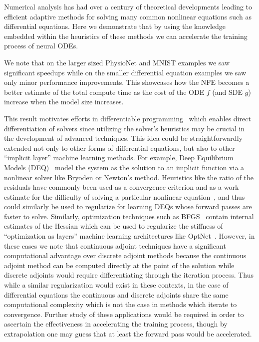 Numerical analysis has had over a century of theoretical developments leading to efficient adaptive methods for solving many common nonlinear equations such as differential equations. Here we demonstrate that by using the knowledge embedded within the heuristics of these methods we can accelerate the training process of neural ODEs.

We note that on the larger sized PhysioNet and MNIST examples we saw significant speedups while on the smaller differential equation examples we saw only minor performance improvements. This showcases how the NFE becomes a better estimate of the total compute time as the cost of the ODE $f$ (and SDE $g$) increase when the model size increases.

This result motivates efforts in differentiable programming~\cite{wang2018backpropagation, abadi2019simple, rackauckas2020generalized} which enables direct differentiation of solvers since utilizing the solver's heuristics may be crucial in the development of advanced techniques. This idea could be straightforwardly extended not only to other forms of differential equations, but also to other ``implicit layer'' machine learning methods. For example, Deep Equilibrium Models (DEQ)~\cite{bai_deep_2019} model the system as the solution to an implicit function via a nonlinear solver like Bryoden or Newton's method. Heuristics like the ratio of the residuals have commonly been used as a convergence criterion and as a work estimate for the difficulty of solving a particular nonlinear equation~\cite{wanner1996solving}, and thus could similarly be used to regularize for learning DEQs whose forward passes are faster to solve. Similarly, optimization techniques such as BFGS~\cite{kelley1999iterative} contain internal estimates of the Hessian which can be used to regularize the stiffness of ``optimization as layers'' machine learning architectures like OptNet~\cite{amos2017optnet}. However, in these cases we note that continuous adjoint techniques have a significant computational advantage over discrete adjoint methods because the continuous adjoint method can be computed directly at the point of the solution while discrete adjoints would require differentiating through the iteration process. Thus while a similar regularization would exist in these contexts, in the case of differential equations the continuous and discrete adjoints share the same computational complexity which is not the case in methods which iterate to convergence. Further study of these applications would be required in order to ascertain the effectiveness in accelerating the training process, though by extrapolation one may guess that at least the forward pass would be accelerated.

